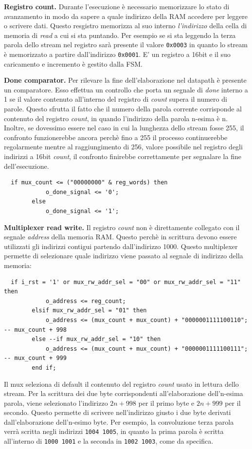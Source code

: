 \documentclass[a4paper]{report}
\begin{document}
\textbf{Registro count.} Durante l'esecuzione è necessario memorizzare lo stato di avanzamento in modo da sapere a quale indirizzo della RAM accedere per leggere o scrivere dati. Questo resgistro memorizza al suo interno \textit{l'indirizzo} della cella di memoria di \textit{read} a cui si sta puntando. Per esempio se si sta leggendo la terza parola dello stream nel registro sarà presente il valore \texttt{0x0003} in quanto lo stream è memorizzato a partire dall'indirizzo \texttt{0x0001}. E' un registro a 16bit e il suo caricamento e incremento è gestito dalla FSM.

\textbf{Done comparator.} Per rilevare la fine dell'elaborazione nel datapath è presente un comparatore. Esso effettua un controllo che porta un segnale di \textit{done} interno a 1 se il valore contenuto all'interno del registro di \textit{count} supera il numero di parole. Questo sfrutta il fatto che il numero della parola corrente corrisponde al contenuto del registro \textit{count}, in quando l'indirizzo della parola n-esima è n. Inoltre, se dovessimo essere nel caso in cui la lunghezza dello stream fosse 255, il confronto funzionerebbe ancora perchè fino a 255 il processo continuerebbe regolarmente mentre al raggiungimento di 256, valore possibile nel registro degli indirizzi a 16bit \textit{count}, il confronto finirebbe correttamente per segnalare la fine dell'esecuzione.
\begin{verbatim}
  if mux_count <= ("00000000" & reg_words) then
            o_done_signal <= '0';
        else
            o_done_signal <= '1';
\end{verbatim}

\textbf{Multiplexer read write.} Il registro \textit{count} non è direttamente collegato con il segnale \textit{address} della memoria RAM. Questo perchè in scrittura devono essere utilizzati gli indirizzi contigui partendo dall'indirizzo 1000. Questo multiplexer permette di selezionare quale indirizzo viene passato al segnale di indirizzo della memoria:
\begin{verbatim}
  if i_rst = '1' or mux_rw_addr_sel = "00" or mux_rw_addr_sel = "11" then
            o_address <= reg_count;
        elsif mux_rw_addr_sel = "01" then
            o_address <= (mux_count + mux_count) + "0000001111100110"; -- mux_count + 998
        else --if mux_rw_addr_sel = "10" then
            o_address <= (mux_count + mux_count) + "0000001111100111"; -- mux_count + 999
        end if;
\end{verbatim}
Il mux seleziona di default il contenuto del registro \textit{count} usato in lettura dello stream. Per la scrittura dei due byte corrispondenti all'elaborazione dell'n-esima parola, viene selezionato l'indirizzo $2n + 998$ per il primo byte e $2n + 999$ per il secondo. Questo permette di scrivere nell'indirizzo giusto i due byte derivati dall'elaborazione dell'n-esimo byte. Per esempio, la convoluzione terza parola verrà scritta negli indirizzi \texttt{1004 1005}, in quanto la prima parola è scritta all'interno di \texttt{1000 1001} e la seconda in \texttt{1002 1003}, come da specifica.
\end{document}
